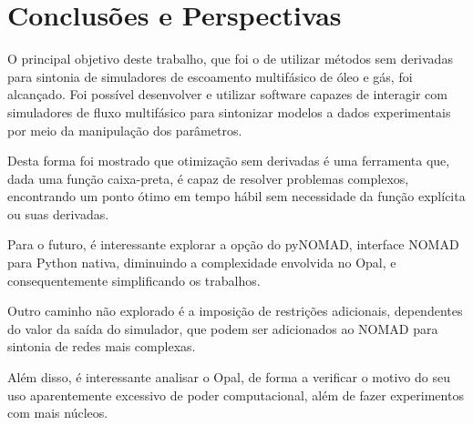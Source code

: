 \chapter{Conclusões e Perspectivas}
%
O principal objetivo deste trabalho, que foi o de utilizar métodos sem derivadas para sintonia de simuladores de escoamento multifásico de óleo e gás, foi alcançado.
%
Foi possível desenvolver e utilizar software capazes de interagir com simuladores de fluxo multifásico para sintonizar modelos a dados experimentais por meio da manipulação dos parâmetros.
%

Desta forma foi mostrado que otimização sem derivadas é uma ferramenta que, dada uma função caixa-preta, é capaz de resolver problemas complexos, encontrando um ponto ótimo em tempo hábil sem necessidade da função explícita ou suas derivadas.
%

Para o futuro, é interessante explorar a opção do pyNOMAD, interface NOMAD para Python nativa, diminuindo a complexidade envolvida no Opal, e consequentemente simplificando os trabalhos.
%

Outro caminho não explorado é a imposição de restrições adicionais, dependentes do valor da saída do simulador, que podem ser adicionados ao NOMAD para sintonia de redes mais complexas.
%

Além disso, é interessante analisar o Opal, de forma a verificar o motivo do seu uso aparentemente excessivo de poder computacional, além de fazer experimentos com mais núcleos.
%
